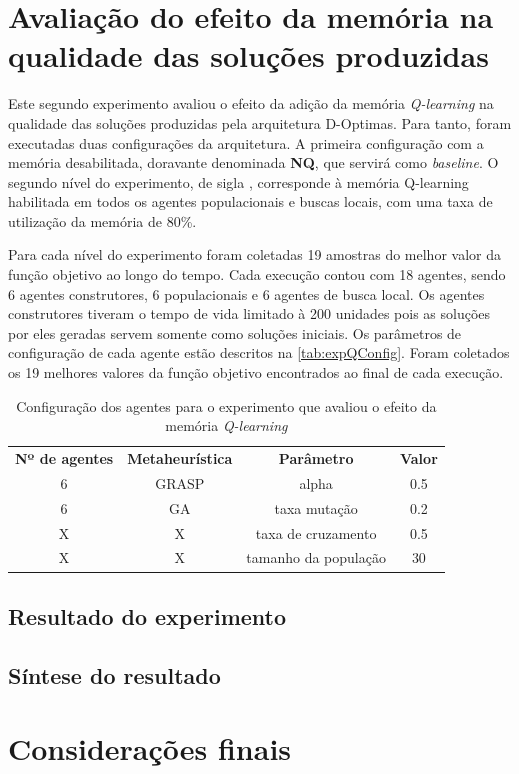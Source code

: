 \section{Avaliação do efeito da memória na qualidade das soluções produzidas}
Este segundo experimento avaliou o efeito da adição da memória \textit{Q-learning} na qualidade das soluções produzidas pela arquitetura D-Optimas. 
Para tanto, foram executadas duas configurações da arquitetura. A primeira configuração com a memória desabilitada, doravante denominada \textbf{NQ}, que servirá como \textit{baseline}. O segundo nível do experimento, de sigla , corresponde à memória Q-learning habilitada em todos os agentes populacionais e buscas locais, com uma taxa de utilização da memória de 80\%.

Para cada nível do experimento foram coletadas 19 amostras do melhor valor da função objetivo ao longo do tempo. Cada execução contou com 18 agentes, sendo 6 agentes construtores, 6 populacionais e 6 agentes de busca local. Os agentes construtores tiveram o tempo de vida limitado à 200 unidades pois as soluções por eles geradas servem somente como soluções iniciais. Os parâmetros de configuração de cada agente estão descritos na \autoref{tab:expQConfig}.
Foram coletados os 19 melhores valores da função objetivo encontrados ao final de cada execução.  

\begin{table}[]
    \centering
    \begin{tabular}{cccc}
         \textbf{Nº de agentes}&\textbf{Metaheurística}&\textbf{Parâmetro} & \textbf{Valor}  \\
         6 & GRASP & alpha & 0.5 \\
         6 & GA    & taxa mutação & 0.2  \\
         X & X     & taxa de cruzamento & 0.5 \\
         X & X     & tamanho da população & 30 \\
         
    \end{tabular}
    \caption{Configuração dos agentes para o experimento que avaliou o efeito da memória \textit{Q-learning}}
    \label{tab:expQConfig}
\end{table}

\subsection{Resultado do experimento}


\subsection{Síntese do resultado}

\section{Considerações finais}
